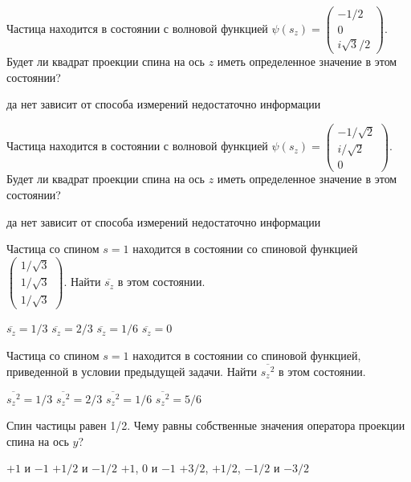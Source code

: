 \documentclass[11pt,a4paper]{exam}
\begin{document}
\begin{questions}
\question Частица находится в состоянии с волновой функцией $\psi \left( {{s_z}} \right) = \left( {\begin{array}{*{20}{c}}
{ - 1/2}\\
0\\
{i\sqrt 3 /2}
\end{array}} \right)$. Будет ли квадрат проекции спина на ось $z$ иметь определенное значение в этом состоянии?
\begin{choices}
\choice да                
\choice нет      
\choice зависит от способа измерений     
\choice недостаточно информации
\end{choices}

\question Частица находится в состоянии с волновой функцией $\psi \left( {{s_z}} \right) = \left( {\begin{array}{*{20}{c}}
{ - 1/\sqrt 2 }\\
{i/\sqrt 2 }\\
0
\end{array}} \right)$. Будет ли квадрат проекции спина на ось $z$ иметь определенное значение в этом состоянии?
\begin{choices}
\choice да                
\choice нет      
\choice зависит от способа измерений     
\choice недостаточно информации
\end{choices}

\question Частица со спином $s = 1$ находится в состоянии со спиновой функцией 
$\left( {\begin{array}{*{20}{c}}
{1/\sqrt 3 }\\
{1/\sqrt 3 }\\
{1/\sqrt 3 }
\end{array}} \right)$. Найти $\overline {{s_z}} $ в этом состоянии.
\begin{choices}
\choice $\overline {{s_z}}  = 1/3$    
\choice $\overline {{s_z}}  = 2/3$    
\choice $\overline {{s_z}}  = 1/6$    
\choice $\overline {{s_z}}  = 0$
\end{choices}

\question Частица со спином $s = 1$ находится в состоянии со спиновой функцией, приведенной в условии предыдущей задачи. Найти $\overline {{s_z}^2} $ в этом состоянии.
\begin{choices}
\choice $\overline {{s_z}^2}  = 1/3$     
\choice $\overline {{s_z}^2}  = 2/3$     
\choice $\overline {{s_z}^2}  = 1/6$     
\choice $\overline {{s_z}^2}  = 5/6$
\end{choices}

\question Спин частицы равен 1/2. Чему равны собственные значения оператора проекции спина на ось $y$?
\begin{choices}
\choice $ + 1$ и $ - 1$         
\choice $ + 1/2$ и $ - 1/2$
\choice $ + 1$, 0 и $ - 1$         
\choice $ + 3/2$, $ + 1/2$, $ - 1/2$ и $ - 3/2$
\end{choices}


\end{questions}
\end{document}

